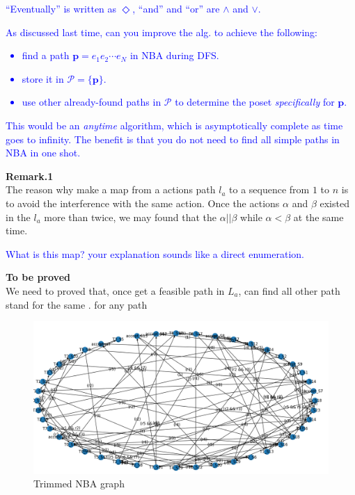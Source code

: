 \documentclass{article}
\newcommand{\blue}[1]{\textcolor{blue}{#1}}
\begin{document}
\blue{``Eventually'' is written as $\Diamond$, ``and'' and ``or'' are $\land$ and $\lor$.}

\blue{As discussed last time, can you improve the alg. to achieve the following:
\begin{itemize}
\item find a path $\mathbf{p}=e_1e_2\cdots e_N$ in NBA during DFS.
\item store it in $\mathcal{P}=\{\mathbf{p}\}$.
\item use other already-found paths in $\mathcal{P}$ to determine the poset \emph{specifically} for $\mathbf{p}$.
\end{itemize}
This would be an \emph{anytime} algorithm, which is asymptotically complete as time goes to infinity.
The benefit is that you do not need to find all simple paths in NBA in one shot. 
}

\textbf{Remark.1} \\
	 The reason why make a map from a actions path $l_a$ to a sequence from $1$ to $n$ is to avoid the interference with the same action.
	  Once the actions $\alpha$ and $\beta$ existed in the $l_a$ more than twice, we may found that the $\alpha||\beta$ while $\alpha<\beta$ at the same time.

\blue{What is this map? your explanation sounds like a direct enumeration.}
  
\textbf{To be proved} \\
	We need to proved that, once get a feasible path in $L_a$, can find all other path stand for the same . for any path 
  
 	
 	\begin{figure}[htp]
 		\centering
 		\includegraphics[width=0.66\linewidth,height=0.4\linewidth]{fig/2.jpg}
 		\caption{Trimmed NBA graph}
 	\end{figure}
 
\end{document}
